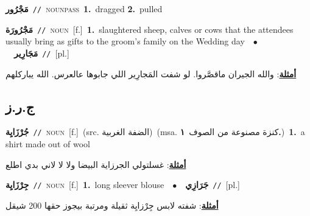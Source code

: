 \documentclass[10pt,a4paper,twoside]{article} %
\begin{document}
\begin{multicols}{2}
{\setlength\topsep{0pt}\textbf{\foreignlanguage{arabic}{مَجْرُور}}\ {\color{gray}\texttt{//}\color{black}}\ \textsc{noun\textunderscore pass}\ \textbf{1.}~dragged  \textbf{2.}~pulled\ } \vspace{2mm}

{\setlength\topsep{0pt}\textbf{\foreignlanguage{arabic}{مَجْرُورَة}}\ {\color{gray}\texttt{//}\color{black}}\ \textsc{noun}\ [f.]\ \textbf{1.}~slaughtered sheep, calves or cows that the attendees usually bring as gifts to the groom's family on the Wedding day\ \ $\bullet$\ \ \setlength\topsep{0pt}\textbf{\foreignlanguage{arabic}{مَجَارِير}}\ {\color{gray}\texttt{//}\color{black}}\ [pl.]\  \begin{flushright}\color{gray}\foreignlanguage{arabic}{\textbf{\underline{\foreignlanguage{arabic}{أمثلة}}}: والله الجيران ماقصَّروا. لو شفت المَجارِير اللي جابوها عالعرس. الله يباركلهم}\end{flushright}\color{black}} \vspace{2mm}

\vspace{-3mm}
\subsection*{\color{blue}\foreignlanguage{arabic}{ج.ر.ز}\color{blue}{}} 

{\setlength\topsep{0pt}\textbf{\foreignlanguage{arabic}{جُرْزَايِة}}\ {\color{gray}\texttt{//}\color{black}}\ \textsc{noun}\ [f.]\ (src. \color{gray}\foreignlanguage{arabic}{الضفة الغربية}\color{black})\ \color{gray}(msa. \foreignlanguage{arabic}{كنزة مصنوعة من الصوف}~\foreignlanguage{arabic}{\textbf{١.}})\color{black}\ \textbf{1.}~a shirt made out of wool\  \begin{flushright}\color{gray}\foreignlanguage{arabic}{\textbf{\underline{\foreignlanguage{arabic}{أمثلة}}}: غسلتولي الجرزاية البيضا ولا لا لاني بدي اطلع}\end{flushright}\color{black}} \vspace{2mm}

{\setlength\topsep{0pt}\textbf{\foreignlanguage{arabic}{جِرْزَايِة}}\ {\color{gray}\texttt{//}\color{black}}\ \textsc{noun}\ [f.]\ \textbf{1.}~long sleever blouse\ \ $\bullet$\ \ \setlength\topsep{0pt}\textbf{\foreignlanguage{arabic}{جَرَازِي}}\ {\color{gray}\texttt{//}\color{black}}\ [pl.]\  \begin{flushright}\color{gray}\foreignlanguage{arabic}{\textbf{\underline{\foreignlanguage{arabic}{أمثلة}}}: شفته لابس جِرْزايِة ثقيلة ومرتبة بيجوز حقها 200 شيقل}\end{flushright}\color{black}} \vspace{2mm}


\end{multicols}
\end{document}

